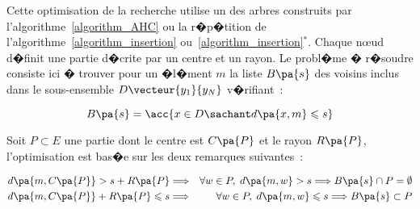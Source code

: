 Cette optimisation de la recherche utilise un des arbres construits par l'algorithme~\ref{algorithm_AHC} ou la r�p�tition de l'algorithme~\ref{algorithm_insertion} ou~\ref{algorithm_insertion}$^*$. Chaque n\oe ud d�finit une partie d�crite par un centre et un rayon. Le probl�me � r�soudre consiste ici � trouver pour un �l�ment $m$ la liste $B\pa{s}$ des voisins inclus dans le sous-ensemble $D\vecteur{y_1}{y_N}$ v�rifiant~:

            $$
            B\pa{s} = \acc{ x \in D \sachant d\pa{x,m} \leqslant s }
            $$

Soit $P \subset E$ une partie dont le centre est $C\pa{P}$ et le rayon $R\pa{P}$, l'optimisation est bas�e sur les deux remarques suivantes~:

    \begin{eqnarray}
    d\pa{m,C\pa{P}} > s + R\pa{P}                 &\Longrightarrow& 
                                                                                \forall w \in P, \; d\pa{m,w} > s 
                                                    \Longrightarrow    B\pa{s} \cap P = \emptyset                    \label{equation_un}     \\
    d\pa{m,C\pa{P}} + R\pa{P} \leqslant s     &\Longrightarrow& 
                                                                                \forall w \in P, \; d\pa{m,w} \leqslant s 
                                                                            \Longrightarrow    B\pa{s} \subset  P \label{equation_deux} 
    \end{eqnarray}




